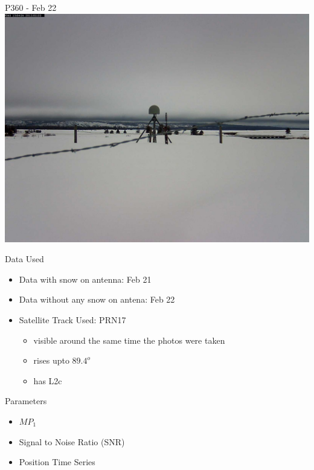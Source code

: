 \documentclass{beamer}
\begin{document}
\begin{frame}{P360 - Feb 22}
\includegraphics[width=9\linewidth,trim=100 600 100 600]{img/P36020120222_130426M.jpg}
\end{frame}


\begin{frame}{Data Used}
\begin{itemize}
  \item Data with snow on antenna: Feb 21
  \item Data without any snow on antena: Feb 22
  \item Satellite Track Used: PRN17 
    \begin{itemize}
      \item visible around the same time the photos were taken
      \item rises upto $89.4^o$
      \item has L2c
    \end{itemize}
\end{itemize}
\end{frame}


\begin{frame}{Parameters}
\begin{itemize}
  \item $MP_1$
  \item Signal to Noise Ratio (SNR)
  \item Position Time Series
\end{itemize}
\end{frame}
\end{document}
